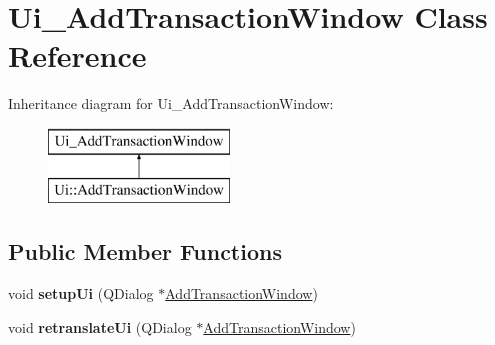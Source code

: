 \hypertarget{class_ui___add_transaction_window}{}\section{Ui\+\_\+\+Add\+Transaction\+Window Class Reference}
\label{class_ui___add_transaction_window}
Inheritance diagram for Ui\+\_\+\+Add\+Transaction\+Window\+:\begin{figure}[H]
\begin{center}
\leavevmode
\includegraphics[height=2.000000cm]{class_ui___add_transaction_window}
\end{center}
\end{figure}
\subsection*{Public Member Functions}
\begin{DoxyCompactItemize}
\item 
\mbox{\label{class_ui___add_transaction_window_acc8c168b2fa7f518476b72fbf784b4f8}} 
void {\bfseries setup\+Ui} (Q\+Dialog $\ast$\mbox{\hyperlink{class_add_transaction_window}{Add\+Transaction\+Window}})
\item 
\mbox{\label{class_ui___add_transaction_window_aab5158e82c0b6a66de42d126d8d04c16}} 
void {\bfseries retranslate\+Ui} (Q\+Dialog $\ast$\mbox{\hyperlink{class_add_transaction_window}{Add\+Transaction\+Window}})
\end{DoxyCompactItemize}
